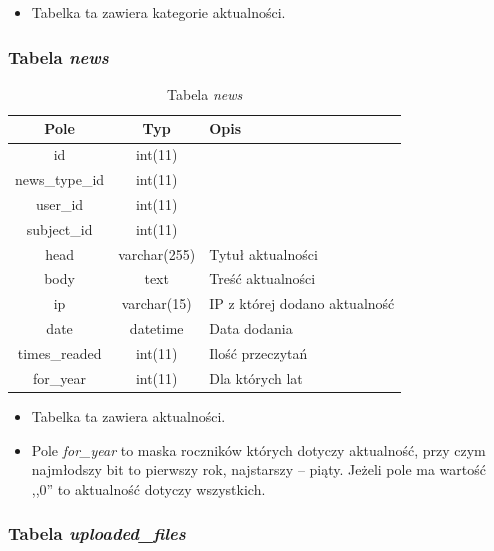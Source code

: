 \documentclass[a4paper,12pt,oneside]{report}
\begin{document}
\begin{itemize}
  \item Tabelka ta zawiera kategorie aktualności.
\end{itemize}

\newpage
\subsubsection{Tabela \emph{news}}
\label{subsub:news}

\begin{table}[h]
  \centering
  \begin{tabular}{|c|c|l|}\hline
  Pole & Typ & Opis \\\hline
  id             & int(11)      & \\
  news\_type\_id & int(11)      & \\
  user\_id       & int(11)      & \\
  subject\_id    & int(11)      & \\
  head           & varchar(255) & Tytuł aktualności \\
  body           & text         & Treść aktualności \\
  ip             & varchar(15)  & IP z której dodano aktualność \\
  date           & datetime     & Data dodania \\
  times\_readed  & int(11)      & Ilość przeczytań \\
  for\_year      & int(11)      & Dla których lat \\\hline
  \end{tabular}
  \caption{Tabela \emph{news}\label{tab:news}}
\end{table}

\begin{itemize}
  \item Tabelka ta zawiera aktualności.
  \item Pole \emph{for\_year} to maska roczników których dotyczy aktualność, przy czym najmłodszy bit to pierwszy rok, najstarszy -- piąty. Jeżeli pole ma wartość ,,0'' to aktualność dotyczy wszystkich.
\end{itemize}

\subsubsection{Tabela \emph{uploaded\_files}}
\label{subsub:uploaded_files}
\end{document}
